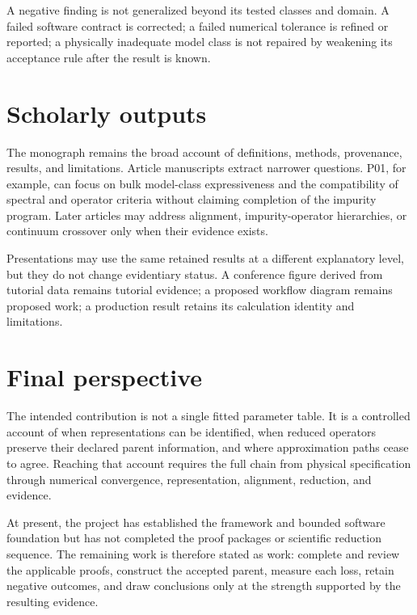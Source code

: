 A negative finding is not generalized beyond its tested classes and domain. A
failed software contract is corrected; a failed numerical tolerance is refined
or reported; a physically inadequate model class is not repaired by weakening
its acceptance rule after the result is known.

\section{Scholarly outputs}

The monograph remains the broad account of definitions, methods, provenance,
results, and limitations. Article manuscripts extract narrower questions.
P01, for example, can focus on bulk model-class expressiveness and the
compatibility of spectral and operator criteria without claiming completion of
the impurity program. Later articles may address alignment, impurity-operator
hierarchies, or continuum crossover only when their evidence exists.

Presentations may use the same retained results at a different explanatory
level, but they do not change evidentiary status. A conference figure derived
from tutorial data remains tutorial evidence; a proposed workflow diagram
remains proposed work; a production result retains its calculation identity and
limitations.

\section{Final perspective}

The intended contribution is not a single fitted parameter table. It is a
controlled account of when representations can be identified, when reduced
operators preserve their declared parent information, and where approximation
paths cease to agree. Reaching that account requires the full chain from
physical specification through numerical convergence, representation,
alignment, reduction, and evidence.

At present, the project has established the framework and bounded software
foundation but has not completed the proof packages or scientific reduction
sequence. The remaining work is therefore stated as work: complete and review
the applicable proofs, construct the accepted parent, measure each loss, retain
negative outcomes, and draw conclusions only at the strength supported by the
resulting evidence.
